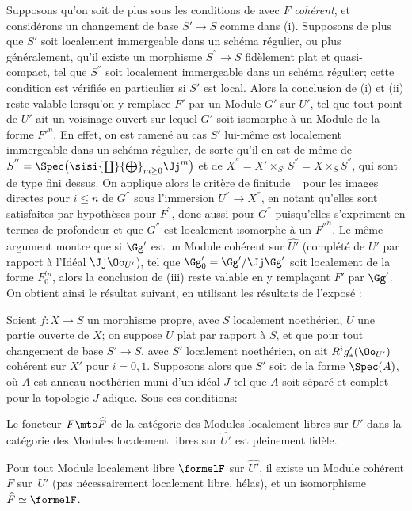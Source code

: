 \begin{remarque} \label{XII.5.9}
Supposons qu'on soit de plus sous les conditions de  avec $F$ \emph{coh\'erent}, et consid\'erons un changement de base $S'\to S$ comme dans  (i). Supposons de plus que $S'$ soit localement immergeable dans un sch\'ema r\'egulier, ou plus g\'en\'eralement, qu'il existe un morphisme $S^{''}\to S$ fid\`element plat et quasi-compact, tel que $S^{''}$ soit localement immergeable dans un sch\'ema r\'egulier; cette condition est v\'erifi\'ee en particulier si $S'$ est local. Alors la conclusion de  (i) et (ii) reste valable lorsqu'on y remplace $F'$ par un Module $G'$ sur $U'$, tel que tout point de $U'$ ait un voisinage ouvert sur lequel $G'$ soit isomorphe \`a un Module de la forme ${F'}^n$. En effet, on est ramen\'e au cas $S'$ lui-m\^eme est localement immergeable dans un sch\'ema r\'egulier, de sorte qu'il en est de m\^eme de $S^{''}=\Spec\big(\sisi{\coprod}{\bigoplus}_{m\geq 0}\Jj^m\big)$ et de $X^{''}=X'\times_{S'} S^{''}= X\times_{S} S^{''}$, qui sont de type fini dessus. On applique alors le crit\`ere de finitude ~ pour les images directes pour $i\leq n$ de $G^{''}$ sous l'immersion $U^{''}\to X^{''}$, en notant qu'elles sont satisfaites par hypoth\`eses pour $F^{''}$\pageoriginaled, donc aussi pour $G^{''}$ puisqu'elles s'expriment en termes de profondeur et que $G^{''}$ est localement isomorphe \`a un ${F^{''}}^n$. Le m\^eme argument montre que si $\Gg'$ est un Module coh\'erent sur $\widehat{U'}$ (compl\'et\'e de $U'$ par rapport \`a l'Id\'eal $\Jj\Oo_{U'}$), tel que $\Gg'_0=\Gg'/\Jj\Gg'$ soit localement de la forme $F_0^{'n}$, alors la conclusion de (iii) reste valable en y rempla\c cant $F'$ par $\Gg'$. On obtient ainsi le r\'esultat suivant, en utilisant les r\'esultats de l'expos\'e :
\end{remarque}

\begin{corollaire} \label{XII.5.10}
Soient $f:X\to S$ un morphisme propre, avec $S$ localement noeth\'erien, $U$ une partie ouverte de $X$; on suppose $U$ plat par rapport \`a $S$, et que pour tout changement de base $S'\to S$, avec $S'$ localement noeth\'erien, on ait $R^ig'_\ast(\Oo_{U'})$ coh\'erent sur $X'$ pour $i=0, 1$. Supposons alors que $S'$ soit de la forme $\Spec(A)$, o\`u $A$ est anneau noeth\'erien muni d'un id\'eal $J$ tel que $A$ soit s\'epar\'e et complet pour la topologie $J$-adique. Sous ces conditions:
\begin{enumeratei}
\item
Le foncteur $F\mto\widehat{F}$ de la cat\'egorie des Modules localement libres sur $U'$ dans la cat\'egorie des Modules localement libres sur $\widehat{U'}$ est pleinement fid\`ele.
\item
Pour tout Module localement libre $\formelF$ sur $\widehat{U'}$, il existe un Module coh\'erent $F$ sur~$U'$ (pas n\'ecessairement localement libre, h\'elas), et un isomorphisme $\widehat{F}\simeq \formelF$.
\end{enumeratei}
\end{corollaire}

